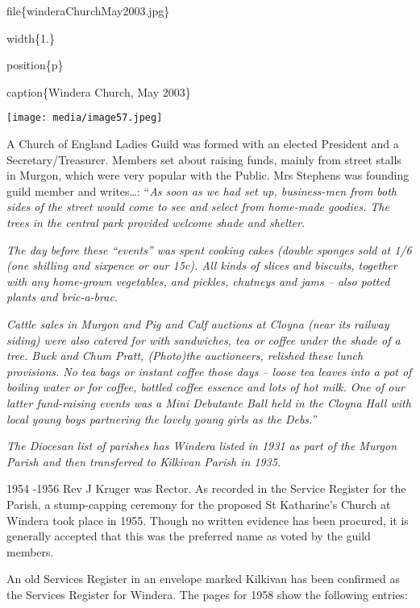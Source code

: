 file\{winderaChurchMay2003.jpg\}

width\{1.\}

position\{p\}

caption\{Windera Church, May 2003\}

\texttt{[image: media/image57.jpeg]}

A Church of England Ladies Guild was formed with an elected President and a Secretary/Treasurer. Members set about raising funds, mainly from street stalls in Murgon, which were very popular with the Public. Mrs Stephens was founding guild member and writes\ldots: ``\emph{As soon as we had set up, business-men from both sides of the street would come to see and select from home-made goodies. The trees in the central park provided welcome shade and shelter.}

\emph{The day before these ``events'' was spent cooking cakes (double sponges sold at 1/6 (one shilling and sixpence or our 15c). All kinds of slices and biscuits, together with any home-grown vegetables, and pickles, chutneys and jams -- also potted plants and bric-a-brac.}

\emph{Cattle sales in Murgon and Pig and Calf auctions at Cloyna (near its railway siding) were also catered for with sandwiches, tea or coffee under the shade of a tree. Buck and Chum Pratt, (Photo)the auctioneers, relished these lunch provisions. No tea bags or instant coffee those days -- loose tea leaves into a pot of boiling water or for coffee, bottled coffee essence and lots of hot milk. One of our latter fund-raising events was a Mini Debutante Ball held in the Cloyna Hall with local young boys partnering the lovely young girls as the Debs.''}

\emph{The Diocesan list of parishes has Windera listed in 1931 as part of the Murgon Parish and then transferred to Kilkivan Parish in 1935.}

1954 -1956 Rev J Kruger was Rector. As recorded in the Service Register for the Parish, a stump-capping ceremony for the proposed St Katharine's Church at Windera took place in 1955. Though no written evidence has been procured, it is generally accepted that this was the preferred name as voted by the guild members.

An old Services Register in an envelope marked Kilkivan has been confirmed as the Services Register for Windera. The pages for 1958 show the following entries:


